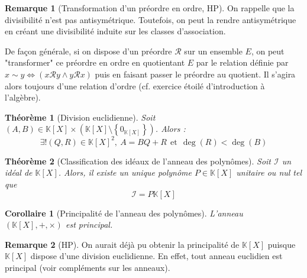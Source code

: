 \documentclass[french]{book}
\newcommand{\K}{\mathbb{K}}
\theoremstyle{plain}
\newtheorem{thm}{Théorème}[chapter]
\newtheorem{cor}{Corollaire}[chapter]
\theoremstyle{definition}
\newtheorem{rmq}{Remarque}[chapter]
\theoremstyle{remark}
\begin{document}
\begin{rmq}[Transformation d'un préordre en ordre, HP]
	On rappelle que la divisibilité n'est pas antisymétrique. Toutefois, on peut la rendre antisymétrique en créant une divisibilité induite sur les classes d'association. \par De façon générale, si on dispose d'un préordre $\mathcal{R}$ sur un ensemble $E$, on peut "transformer" ce préordre en ordre en quotientant $E$ par le relation définie par $x\sim y \iff (x\mathcal{R}y\land y\mathcal{R}x)$ puis en faisant passer le préordre au quotient. Il s'agira alors toujours d'une relation d'ordre (cf. exercice étoilé d'introduction à l'algèbre).
\end{rmq}
\begin{thm}[Division euclidienne]
	Soit $(A,B)\in\K[X]\times(\K[X]\setminus\left\{0_{\K[X]}\right\})$. Alors : $$\exists!(Q,R)\in\K[X]^2,\ A=BQ+R \ \ \text{et} \ \ \deg(R)<\deg(B)$$
\end{thm}
\begin{thm}[Classification des idéaux de l'anneau des polynômes]
	Soit $\mathcal{I}$ un idéal de $\K[X]$. Alors, il existe un unique polynôme $P\in\K[X]$ unitaire ou nul tel que $$\mathcal{I}=P\K[X]$$
\end{thm}
\begin{cor}[Principalité de l'anneau des polynômes]
	L'anneau $(\K[X],+,\times)$ est principal.
\end{cor}
\begin{rmq}[HP]
	On aurait déjà pu obtenir la principalité de $\K[X]$ puisque $\K[X]$ dispose d'une division euclidienne. En effet, tout anneau euclidien est principal (voir compléments sur les anneaux).
\end{rmq}
\end{document}
